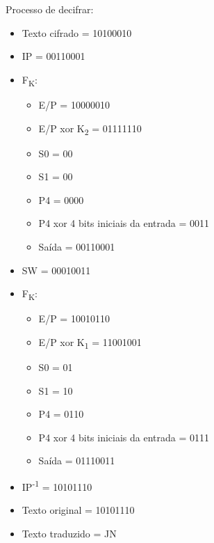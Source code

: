 \documentclass[12pt]{article}
\begin{document}
  Processo de decifrar:
  \begin{itemize}
    \item Texto cifrado = 10100010
    \item IP = 00110001
    \item F\textsubscript{K}:
    \begin{itemize}
      \item E/P = 10000010
      \item E/P xor K\textsubscript{2} = 01111110
      \item S0 = 00
      \item S1 = 00
      \item P4 = 0000
      \item P4 xor 4 bits iniciais da entrada = 0011
      \item Saída = 00110001
    \end{itemize}
    \item SW = 00010011
    \item F\textsubscript{K}:
    \begin{itemize}
      \item E/P = 10010110
      \item E/P xor K\textsubscript{1} = 11001001
      \item S0 = 01
      \item S1 = 10
      \item P4 = 0110
      \item P4 xor 4 bits iniciais da entrada = 0111
      \item Saída = 01110011
    \end{itemize}
    \item IP\textsuperscript{-1} = 10101110
    \item Texto original = 10101110
    \item Texto traduzido = JN
  \end{itemize}
\end{document}
